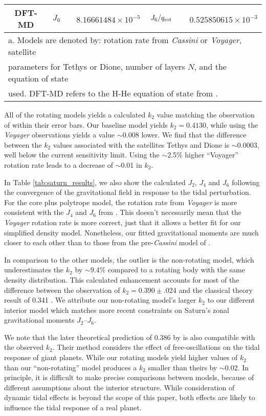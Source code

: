 \begin{table}
\begin{tabular}{ccrcr}
 {DFT-MD}                   &  $J_6$     &  $8.16661484\times10^{-5}      $  &  $J_6/q_{\rm  rot}$  &  $0.525850615\times10^{-3}     $  \\
\hline
\multicolumn{5}{l}{a. Models are denoted by: rotation rate from \textit{Cassini} or \textit{Voyager}, satellite}\\
\multicolumn{5}{l}{parameters for Tethys or Dione, number of layers $N$, and the equation of state } \\
\multicolumn{5}{l}{used. DFT-MD refers to the H-He equation of state from \citet{hubbard2016}.}
\end{tabular}
\end{table}

All of the rotating models yields a calculated $k_2$ value matching the observation
of \citet{lainey2016} within their error bars. Our baseline model yields
$k_2=0.4130$, while using the \textit{Voyager} observations yields a value
$\sim$0.008 lower. We find that the difference between the $k_2$ values associated
with the satellites Tethys and Dione is $\sim$0.0003, well below the current
sensitivity limit. Using the $\sim$2.5\% higher ``Voyager'' rotation rate leads to a
decrease of $\sim$0.01 in $k_2$. 

In Table \ref{tab:saturn_results}, we also show the calculated $J_2$, $J_4$ and $J_6$
following the convergence of the gravitational field in response to the tidal
perturbation. For the core plus polytrope model, the rotation rate from
\textit{Voyager} is more consistent with the $J_4$ and $J_6$ from
\citet{Jacobson2006}. This doesn't necessarily mean that the \textit{Voyager}
rotation rate is more correct, just that it allows a better fit for our simplified
density model. Nonetheless, our fitted gravitational moments are much closer to each
other than to those from the pre-\textit{Cassini} model of \citet{gavrilov1977}.

In comparison to the other models, the outlier is the non-rotating model, which
underestimates the $k_2$ by $\sim9.4$\% compared to a rotating body with the same
density distribution.  This calculated enhancement accounts for most of the
difference between the observation of $k_2=0.390 \pm .024$ \citep{lainey2016} and the
classical theory result of 0.341 \citep{gavrilov1977}. We attribute our non-rotating
model's larger $k_2$ to our different interior model which matches more recent
constraints on Saturn's zonal gravitational moments $J_2$--$J_6$.

We note that the later theoretical prediction of 0.386 by \citet{vorontsov1984} is
also compatible with the observed $k_2$. Their method considers the effect of
free-oscillations on the tidal response of giant planets. While our rotating models
yield higher values of $k_2$ than \citet{vorontsov1984} our ``non-rotating'' model
produces a $k_2$ smaller than theirs by $\sim$0.02. In principle, it is difficult to
make precise comparisons between models, because of different assumptions about the
interior structure. While consideration of dynamic tidal effects is beyond the scope
of this paper, both effects are likely to influence the tidal response of a real
planet.

